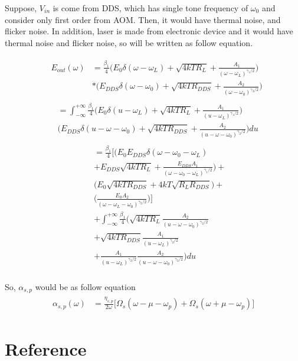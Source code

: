 \documentclass[%
 reprint,
 amsmath,amssymb,
 aps,
]{revtex4-2}
\begin{document}
Suppose, $V_{in}$ is come from DDS, which has single tone frequency of $\omega_{0}$ and consider only first order from AOM. Then, it would have thermal noise, and flicker noise. In addition, laser is made from electronic device and it would have thermal noise and flicker noise, so will be written as follow equation.

\begin{align}
	&\begin{aligned}
	E_{out}(\omega) &= \frac{\beta_{1}}{4}\Bigg(E_{0}\delta(\omega - \omega_{L}) + \sqrt{4kTR_{L}} + \frac{A_{1}}{(\omega-\omega_{L})^{\gamma_{1}/2}}\Bigg)\\
	&* \Bigg(E_{DDS}\delta(\omega-\omega_{0}) + \sqrt{4kTR_{DDS}} + \frac{A_{2}}{(\omega-\omega_{0})^{\gamma_{2}/2}}\Bigg)
	\end{aligned}\\
	&\begin{aligned}
	&= \int_{-\infty}^{+\infty}\frac{\beta_{1}}{4}\Bigg(E_{0}\delta(u - \omega_{L}) + \sqrt{4kTR_{L}} + \frac{A_{1}}{(u-\omega_{L})^{\gamma_{1}/2}}\Bigg)\\
	& \Bigg(E_{DDS}\delta(u-\omega-\omega_{0}) + \sqrt{4kTR_{DDS}} + \frac{A_{2}}{(u-\omega-\omega_{0})^{\gamma_{2}/2}}\Bigg)du
	\end{aligned}
\end{align}
\begin{align}
	&\begin{aligned}
	&= \frac{\beta_{1}}{4}\Bigg[\Bigg(E_{0}E_{DDS}\delta(\omega-\omega_{0} - \omega_{L}) \\
	&+ E_{DDS}\sqrt{4kTR_{L}} + \frac{E_{DDS}A_{1}}{(\omega-\omega_{0}-\omega_{L})^{\gamma_{1}/2}}\Bigg)+\\
	& \Bigg(E_{0}\sqrt{4kTR_{DDS}} + 4kT\sqrt{R_{L}R_{DDS}}\Bigg)+\\
	&\Bigg(\frac{E_{0}A_{2}}{(\omega-\omega_{L}-\omega_{0})^{\gamma_{2}/2}}\Bigg) \Bigg]\\
	&+\int_{-\infty}^{+\infty}\frac{\beta_{1}}{4}\Bigg(\sqrt{4kTR_{L}}\frac{A_{2}}{(u-\omega-\omega_{0})^{\gamma_{2}/2}} \\
	&+ \sqrt{4kTR_{DDS}}\frac{A_{1}}{(u-\omega_{L})^{\gamma_{2}/2}}\\
	&+ \frac{A_{1}}{(u-\omega_{L})^{\gamma_{2}/2}}\frac{A_{2}}{(u-\omega-\omega_{0})^{\gamma_{2}/2}} \Bigg)du
	\end{aligned}\\
\end{align}

So, $\alpha_{s,p}$ would be as follow equation
\begin{align}
	\begin{aligned}	
		\alpha_{s,p}(\omega) &= \frac{\eta_{s,p}}{2\omega}\Bigg[\Omega_{s}(\omega - \mu - \omega_{p})+\Omega_{s}(\omega + \mu - \omega_{p})\Bigg]
	\end{aligned}
\end{align}

\section{\label{sec:level1}Reference}
\end{document}
